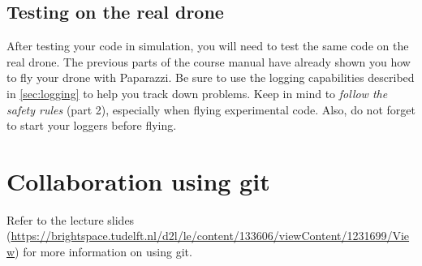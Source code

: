 \documentclass{article}
\begin{document}
\subsection{Testing on the real drone}
After testing your code in simulation, you will need to test the same code on the real drone. The previous parts of the course manual have already shown you how to fly your drone with Paparazzi. Be sure to use the logging capabilities described in \autoref{sec:logging} to help you track down problems. Keep in mind to \emph{follow the safety rules} (part 2), especially when flying experimental code. Also, do not forget to start your loggers before flying.



\section{Collaboration using git}
Refer to the lecture slides (\url{https://brightspace.tudelft.nl/d2l/le/content/133606/viewContent/1231699/View}) for more information on using git.

\end{document}
